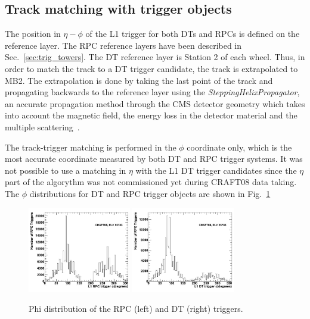 \subsection{Track matching with trigger objects}
The position in $\eta - \phi$ of the L1 trigger for both DTs and RPCs is defined
on the reference layer. The RPC reference layers have been described
in Sec.~\ref{sec:trig_towers}. The DT reference layer is Station 2 
of each wheel. Thus, in order to match the track to a DT trigger candidate, 
the track is extrapolated to MB2.
The extrapolation is done by taking the last point of the track and 
propagating backwards to the reference layer using 
the {\em SteppingHelixPropagator},
an accurate propagation method through the CMS detector
geometry which takes into account the magnetic field, 
the energy loss in the detector material and the 
multiple scattering~\cite{ref:muonreco_note}.

The track-trigger matching is performed in the $\phi$ coordinate 
only, which is the most accurate coordinate measured by both 
DT and RPC trigger systems. It was not possible to use a matching
in $\eta$ with the L1 DT trigger candidates since the $\eta$ part
of the algorythm was not commissioned yet during CRAFT08 data taking. 
The $\phi$ distributions for DT and RPC trigger
objects are shown in Fig.~\ref{fig:trigger_eta_phi}

\begin{figure}[hbtp]
  \begin{center}
    \includegraphics[width=0.4\textwidth]{phi_rpc}
    \includegraphics[width=0.4\textwidth]{phi_dt}
      \caption{Phi distribution of the RPC (left) and DT (right) triggers.}
    \label{fig:trigger_eta_phi}
  \end{center}
\end{figure}

